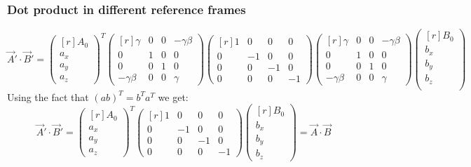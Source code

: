 \subsubsection{Dot product in different reference frames}
\begin{equation}
    \vec{A}' ⋅ \vec{B}' = 
    \begin{pmatrix*}[r]
    A_0 \\
    a_x \\
    a_y \\
    a_z
    \end{pmatrix*}^{T} 
    \begin{pmatrix*}[r]
    γ & 0 & 0 & -γβ \\
    0 & 1 & 0 & 0 \\
    0 & 0 & 1 & 0 \\
    -γβ & 0 & 0 & γ
    \end{pmatrix*} 
    \begin{pmatrix*}[r]
    1 & 0 & 0 & 0 \\
    0 & -1 & 0 & 0 \\
    0 & 0 & -1 & 0 \\
    0 & 0 & 0 & -1
    \end{pmatrix*}
    \begin{pmatrix*}[r]
    γ & 0 & 0 & -γβ \\
    0 & 1 & 0 & 0 \\
    0 & 0 & 1 & 0 \\
    -γβ & 0 & 0 & γ
    \end{pmatrix*}
    \begin{pmatrix*}[r]
    B_0 \\
    b_x \\
    b_y \\
    b_z \\
    \end{pmatrix*}
\end{equation}
Using the fact that $(ab)^{T} = b^{T} a^{T}$ we get:
\begin{equation}
    \vec{A}' ⋅ \vec{B}' = 
    \begin{pmatrix*}[r]
    A_0 \\
    a_x \\
    a_y \\
    a_z
    \end{pmatrix*}^{T}
    \begin{pmatrix*}[r]
    1 & 0 & 0 & 0 \\
    0 & -1 & 0 & 0 \\
    0 & 0 & -1 & 0 \\
    0 & 0 & 0 & -1
    \end{pmatrix*}
    \begin{pmatrix*}[r]
    B_0 \\
    b_x \\
    b_y \\
    b_z
    \end{pmatrix*} = \vec{A} ⋅ \vec{B}
\end{equation}
